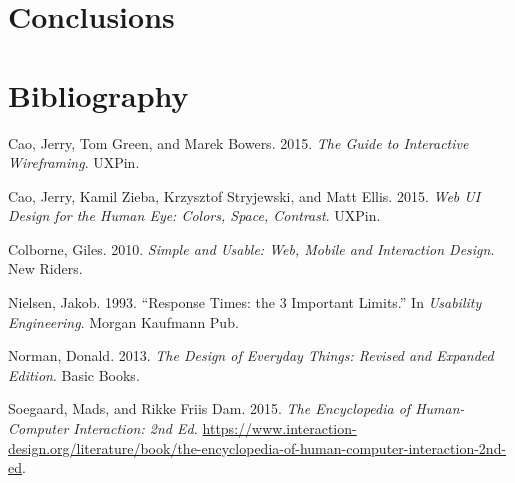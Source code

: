 \documentclass[12pt,svgnames]{memoir}
\begin{document}
\chapter*{Conclusions}\label{conclusions}

\chapter*{Bibliography}\label{bibliography}


Cao, Jerry, Tom Green, and Marek Bowers. 2015. \emph{The Guide to
Interactive Wireframing}. UXPin.

Cao, Jerry, Kamil Zieba, Krzysztof Stryjewski, and Matt Ellis. 2015.
\emph{Web UI Design for the Human Eye: Colors, Space, Contrast}. UXPin.

Colborne, Giles. 2010. \emph{Simple and Usable: Web, Mobile and
Interaction Design}. New Riders.

Nielsen, Jakob. 1993. ``Response Times: the 3 Important Limits.'' In
\emph{Usability Engineering}. Morgan Kaufmann Pub.

Norman, Donald. 2013. \emph{The Design of Everyday Things: Revised and
Expanded Edition}. Basic Books.

Soegaard, Mads, and Rikke Friis Dam. 2015. \emph{The Encyclopedia of
Human-Computer Interaction: 2nd Ed.}
\url{https://www.interaction-design.org/literature/book/the-encyclopedia-of-human-computer-interaction-2nd-ed}.
\end{document}
